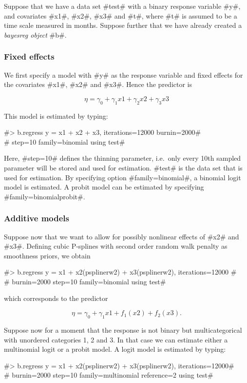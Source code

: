 Suppose that we have a data set #test# with a binary response
variable #y#, and covariates  #x1#, #x2#, #x3#  and #t#, where #t#
is assumed to be a time scale measured in months. Suppose further
that we have already created a {\em bayesreg object} #b#.

\subsubsection*{Fixed effects}

We first specify a model with #y# as the response variable and
fixed effects for the covariates #x1#, #x2# and #x3#. Hence the
predictor is

$$
\eta = \gamma_0 + \gamma_1 x1 + \gamma_2 x2 + \gamma_3 x3
$$

This model is estimated by typing:

#> b.regress y = x1 + x2 + x3, iterations=12000 burnin=2000# \\
#  step=10 family=binomial using test#

Here, #step=10# defines the thinning parameter, i.e.~only every
10th sampled parameter will be stored and used for estimation.
#test# is the data set that is used for estimation. By specifying
option #family=binomial#, a binomial logit model is estimated. A
probit model can be estimated by specifying
#family=binomialprobit#.

\subsubsection*{Additive models}

Suppose now that we want to allow for possibly nonlinear effects
of #x2# and #x3#. Defining cubic P-splines with second order
random walk penalty as smoothness priors, we obtain

#> b.regress y = x1 + x2(psplinerw2) + x3(psplinerw2), iterations=12000 #\\
#  burnin=2000 step=10 family=binomial using test#

which corresponds to the predictor

$$
\eta = \gamma_0 + \gamma_1 x1 + f_1(x2) + f_2(x3).
$$

Suppose now for a moment that the response is not binary but
multicategorical with unordered categories 1, 2 and 3. In that
case we can estimate either a multinomial logit or a probit model.
A logit model is estimated by typing:

#> b.regress y = x1 + x2(psplinerw2) + x3(psplinerw2), iterations=12000# \\
#  burnin=2000 step=10 family=multinomial reference=2 using test#

